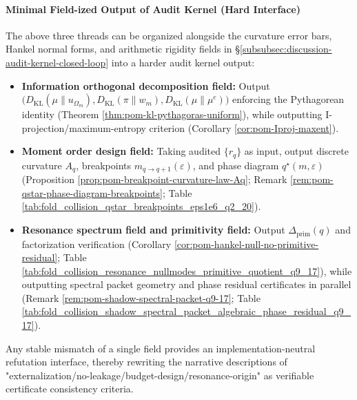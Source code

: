 \paragraph{Minimal Field-ized Output of Audit Kernel (Hard Interface)}
The above three threads can be organized alongside the curvature error bars, Hankel normal forms, and arithmetic rigidity fields in \S\ref{subsubsec:discussion-audit-kernel-closed-loop} into a harder audit kernel output:
\begin{itemize}
  \item \textbf{Information orthogonal decomposition field:} Output \(\bigl(D_{\mathrm{KL}}(\mu\|u_{\Omega_m}),D_{\mathrm{KL}}(\pi\|w_m),D_{\mathrm{KL}}(\mu\|\mu^e)\bigr)\) enforcing the Pythagorean identity (Theorem \ref{thm:pom-kl-pythagoras-uniform}), while outputting I-projection/maximum-entropy criterion (Corollary \ref{cor:pom-Iproj-maxent}).
  \item \textbf{Moment order design field:} Taking audited \(\{r_q\}\) as input, output discrete curvature \(A_q\), breakpoints \(m_{q\to q+1}(\varepsilon)\), and phase diagram \(q^\star(m,\varepsilon)\) (Proposition \ref{prop:pom-breakpoint-curvature-law-Aq}; Remark \ref{rem:pom-qstar-phase-diagram-breakpoints}; Table \ref{tab:fold_collision_qstar_breakpoints_eps1e6_q2_20}).
  \item \textbf{Resonance spectrum field and primitivity field:} Output \(\Delta_{\mathrm{prim}}(q)\) and factorization verification (Corollary \ref{cor:pom-hankel-null-no-primitive-residual}; Table \ref{tab:fold_collision_resonance_nullmodes_primitive_quotient_q9_17}), while outputting spectral packet geometry and phase residual certificates in parallel (Remark \ref{rem:pom-shadow-spectral-packet-q9-17}; Table \ref{tab:fold_collision_shadow_spectral_packet_algebraic_phase_residual_q9_17}).
\end{itemize}
Any stable mismatch of a single field provides an implementation-neutral refutation interface, thereby rewriting the narrative descriptions of "externalization/no-leakage/budget-design/resonance-origin" as verifiable certificate consistency criteria.

